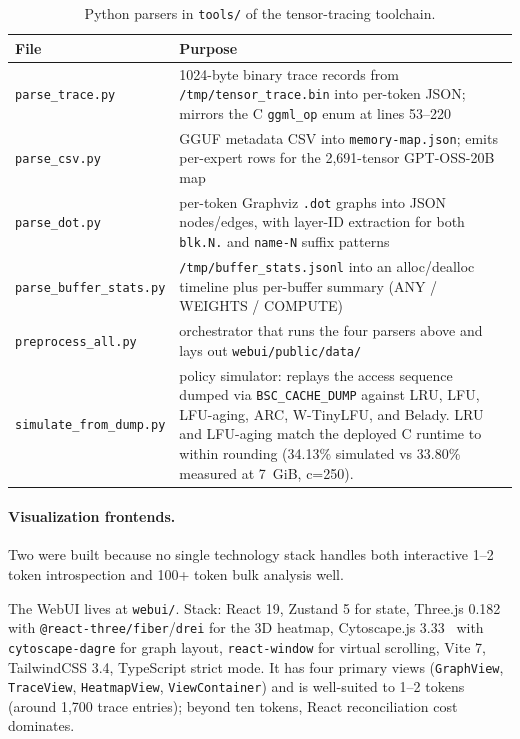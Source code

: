 \begin{table}[htbp]
\caption{Python parsers in \texttt{tools/} of the tensor-tracing toolchain.}
\label{tab:python-parsers}
\centering
\small
\begin{tabular}{@{}lp{8.0cm}@{}}
\toprule
File & Purpose \\
\midrule
\texttt{parse\_trace.py} & 1024-byte binary trace records from \texttt{/tmp/tensor\_trace.bin} into per-token JSON; mirrors the C \texttt{ggml\_op} enum at lines 53--220 \\
\texttt{parse\_csv.py} & GGUF metadata CSV into \texttt{memory-map.json}; emits per-expert rows for the 2,691-tensor GPT-OSS-20B map \\
\texttt{parse\_dot.py} & per-token Graphviz \texttt{.dot} graphs into JSON nodes/edges, with layer-ID extraction for both \texttt{blk.N.} and \texttt{name-N} suffix patterns \\
\texttt{parse\_buffer\_stats.py} & \texttt{/tmp/buffer\_stats.jsonl} into an alloc/dealloc timeline plus per-buffer summary (ANY / WEIGHTS / COMPUTE) \\
\texttt{preprocess\_all.py} & orchestrator that runs the four parsers above and lays out \texttt{webui/public/data/} \\
\texttt{simulate\_from\_dump.py} & policy simulator: replays the access sequence dumped via \texttt{BSC\_CACHE\_DUMP} against LRU, LFU, LFU-aging, ARC, W-TinyLFU, and Belady. LRU and LFU-aging match the deployed C runtime to within rounding (34.13\% simulated vs 33.80\% measured at 7~GiB, c=250). \\
\bottomrule
\end{tabular}
\end{table}

\paragraph{Visualization frontends.} Two were built because no single technology stack handles both interactive 1--2 token introspection and 100+ token bulk analysis well.

The WebUI lives at \texttt{webui/}. Stack: React 19, Zustand 5 for state, Three.js 0.182 with \texttt{@react-three/fiber}/\texttt{drei} for the 3D heatmap, Cytoscape.js 3.33~\cite{cytoscape_js} with \texttt{cytoscape-dagre} for graph layout, \texttt{react-window} for virtual scrolling, Vite 7, TailwindCSS 3.4, TypeScript strict mode. It has four primary views (\texttt{GraphView}, \texttt{TraceView}, \texttt{HeatmapView}, \texttt{ViewContainer}) and is well-suited to 1--2 tokens (around 1,700 trace entries); beyond ten tokens, React reconciliation cost dominates.

